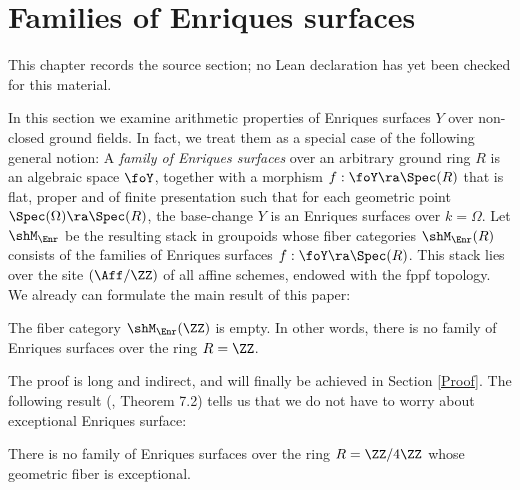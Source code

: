 \chapter{Families of Enriques surfaces}
\label{no-enriques-surface-over-the-integers-chapter-06}

\begin{remark}
\label{no-enriques-surface-over-the-integers-chapter-06-source}
This chapter records the source section; no Lean declaration has yet been checked for this material.
\notready
\end{remark}

\label{Families}

In this section we examine    arithmetic properties of Enriques surfaces $Y$
over non-closed ground fields. In fact, we treat them as a special case of the following general notion:
A \emph{family of Enriques surfaces} over an arbitrary ground ring $R$ is an algebraic space $\foY$,
together with a morphism  $f:\foY\ra\Spec(R)$
that is flat,  proper and of finite presentation such that for each geometric point $\Spec(\Omega)\ra\Spec(R)$,
the base-change $Y$ is an Enriques surfaces over $k=\Omega$.
Let $\shM_\Enr$ be the resulting stack in groupoids
whose fiber categories $\shM_\Enr(R)$ consists
of the families of Enriques surfaces $f:\foY\ra\Spec(R)$.  This stack lies over the site $(\Aff/\ZZ)$ of
all affine schemes, endowed with the fppf topology.
We already   can formulate the main result of this paper:

\begin{theorem}
\notready
\label{no enriques over integers}
The fiber category $\shM_\Enr(\ZZ)$ is empty. In other words,
there is no family of Enriques surfaces over the ring $R=\ZZ$.
\end{theorem}

The proof is long and indirect, and will  finally be achieved  in Section \ref{Proof}.
The following result  (\cite{Schroeer-2021b}, Theorem 7.2) tells us that we do not have to worry
about
exceptional Enriques surface:

\begin{theorem}
\notready
\label{no exceptional}
There is no family of Enriques surfaces over the ring $R=\ZZ/4\ZZ$ whose
geometric fiber is exceptional.
\end{theorem}

